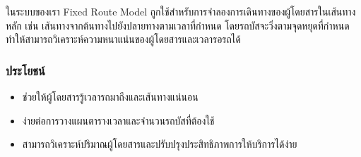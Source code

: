 \indent ในระบบของเรา Fixed Route Model ถูกใช้สำหรับการจำลองการเดินทางของผู้โดยสารในเส้นทางหลัก เช่น เส้นทางจากต้นทางไปยังปลายทางตามเวลาที่กำหนด โดยรถบัสจะวิ่งตามจุดหยุดที่กำหนด 
ทำให้สามารถวิเคราะห์ความหนาแน่นของผู้โดยสารและเวลารอรถได้

\subsubsection{ประโยชน์}
\begin{itemize}
  \item ช่วยให้ผู้โดยสารรู้เวลารถมาถึงและเส้นทางแน่นอน
  \item ง่ายต่อการวางแผนตารางเวลาและจำนวนรถบัสที่ต้องใช้
  \item สามารถวิเคราะห์ปริมาณผู้โดยสารและปรับปรุงประสิทธิภาพการให้บริการได้ง่าย
\end{itemize}